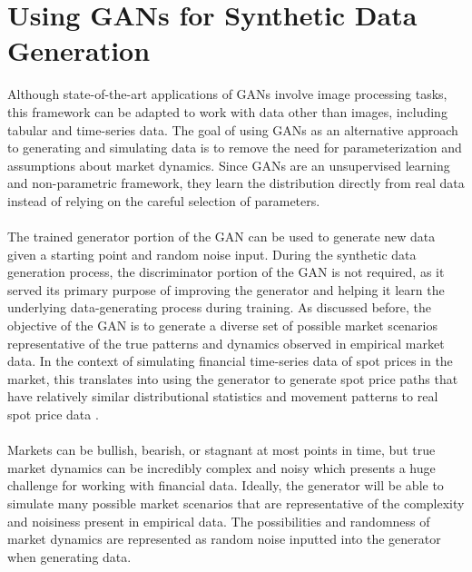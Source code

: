 \section{Using GANs for Synthetic Data Generation}
Although state-of-the-art applications of GANs involve image processing tasks, this framework can be adapted to work with data other than images, including tabular and time-series data. The goal of using GANs as an alternative approach to generating and simulating data is to remove the need for parameterization and assumptions about market dynamics. Since GANs are an unsupervised learning and non-parametric framework, they learn the distribution directly from real data instead of relying on the careful selection of parameters.
\\
\\
The trained generator portion of the GAN can be used to generate new data given a starting point and random noise input. During the synthetic data generation process, the discriminator portion of the GAN is not required, as it served its primary purpose of improving the generator and helping it learn the underlying data-generating process during training. As discussed before, the objective of the GAN is to generate a diverse set of possible market scenarios representative of the true patterns and dynamics observed in empirical market data. In the context of simulating financial time-series data of spot prices in the market, this translates into using the generator to generate spot price paths that have relatively similar distributional statistics and movement patterns to real spot price data \cite{stock-gan}.
\\
\\
Markets can be bullish, bearish, or stagnant at most points in time, but true market dynamics can be incredibly complex and noisy which presents a huge challenge for working with financial data. Ideally, the generator will be able to simulate many possible market scenarios that are representative of the complexity and noisiness present in empirical data. The possibilities and randomness of market dynamics are represented as random noise inputted into the generator when generating data.
